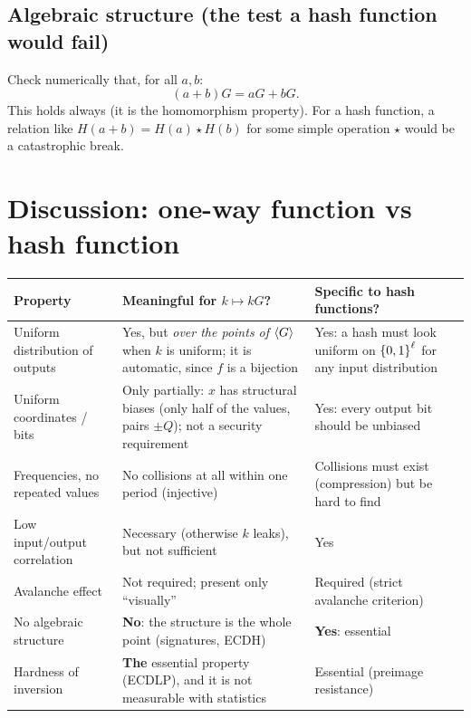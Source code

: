 \subsection{Algebraic structure (the test a hash function would fail)}

Check numerically that, for all $a, b$:
\[
  (a + b)G = aG + bG .
\]
This holds always (it is the homomorphism property). For a hash function, a relation like $H(a + b) = H(a) \star H(b)$ for some simple operation $\star$ would be a catastrophic break.

\section{Discussion: one-way function vs hash function}

\begin{center}
  \small
  \begin{tabularx}{\textwidth}{l X X}
    \toprule
    Property & Meaningful for $k \mapsto kG$? & Specific to hash functions? \\
    \midrule
    Uniform distribution of outputs & Yes, but \textit{over the points of $\left\langle G \right\rangle$} when $k$ is uniform; it is automatic, since $f$ is a bijection & Yes: a hash must look uniform on $\left\{0,1\right\}^\ell$ for any input distribution \\
    Uniform coordinates / bits & Only partially: $x$ has structural biases (only half of the values, pairs $\pm Q$); not a security requirement & Yes: every output bit should be unbiased \\
    Frequencies, no repeated values & No collisions at all within one period (injective) & Collisions must exist (compression) but be hard to find \\
    Low input/output correlation & Necessary (otherwise $k$ leaks), but not sufficient & Yes \\
    Avalanche effect & Not required; present only ``visually'' & Required (strict avalanche criterion) \\
    No algebraic structure & \textbf{No}: the structure is the whole point (signatures, ECDH) & \textbf{Yes}: essential \\
    Hardness of inversion & \textbf{The} essential property (ECDLP), and it is not measurable with statistics & Essential (preimage resistance) \\
    \bottomrule
  \end{tabularx}
\end{center}

